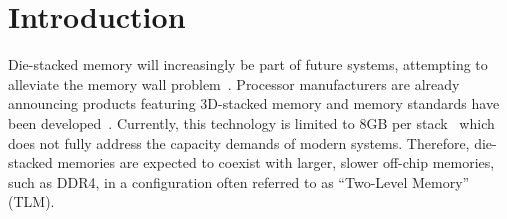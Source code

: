 \section{Introduction}
\label{sec:Introduction}
  


Die-stacked memory will increasingly be part of future systems, 
attempting to alleviate 
the memory wall problem~\cite{wulf-can95}. Processor manufacturers are 
already announcing products featuring 3D-stacked memory \cite{KnightsLanding,NVIDIA,black-micro2013}  and memory standards have been developed~\cite{jedec-wideio,JEDEC-HBM,pawlowski-hotchips2011}. 
Currently, this technology is limited to 8GB per stack~\cite{JEDEC-HBM-REVISED}
which does not fully address the capacity demands of modern systems. 
Therefore, die-stacked memories are expected to coexist with larger, 
slower off-chip memories, such as DDR4, in a configuration often
referred to as ``Two-Level Memory'' (TLM).  

